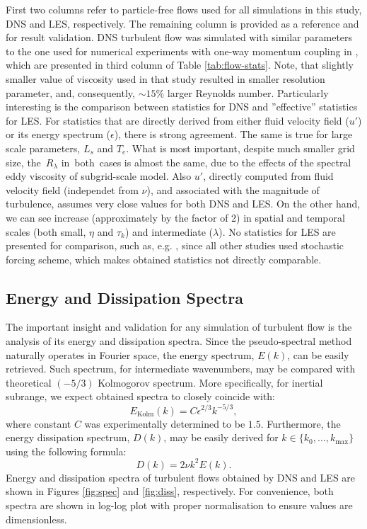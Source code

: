 \documentclass{pracamgren}
\begin{document}
First two columns refer to particle-free flows used for all simulations in this study, DNS and LES, respectively.
The remaining column is provided as a reference and for result validation.
DNS turbulent flow was simulated with similar parameters to the one used for numerical experiments with one-way momentum coupling in \textcite[Table 1, entry for $256^3$]{Rosa2013}, which are presented in third column of Table \ref{tab:flow-stats}.
Note, that slightly smaller value of viscosity used in that study resulted in smaller resolution parameter, and, consequently, $\sim 15\%$ larger Reynolds number.
Particularly interesting is the comparison between statistics for DNS and ''effective'' statistics for LES.
For statistics that are directly derived from either fluid velocity field ($u'$) or its energy spectrum ($\epsilon$), there is strong agreement.
The same is true for large scale parameters, $L_s$ and $T_e$.
What is most important, despite much smaller grid size, the~$R_{\lambda}$ in~both~cases is almost the same, due to the effects of the spectral eddy viscosity of subgrid-scale model.
Also $u'$, directly computed from fluid velocity field (independet from $\nu$), and associated with the magnitude of turbulence, assumes very close values for both DNS and LES.  
On the other hand, we can see increase (approximately by the factor of 2) in spatial and temporal scales (both small, $\eta$ and $\tau_k$) and intermediate ($\lambda$).
No statistics for LES are presented for comparison, such as, e.g. \textcite[Table 1]{Rosa2017}, since all other studies used stochastic forcing scheme, which makes obtained statistics not directly comparable.

\subsection{Energy and Dissipation Spectra}
\label{ssc:ch2.flow.spec}

The important insight and validation for any simulation of turbulent flow is the analysis of its energy and dissipation spectra.
Since the pseudo-spectral method naturally operates in Fourier space, the energy spectrum, $E(k)$, can be easily retrieved.
Such spectrum, for intermediate wavenumbers, may be compared with theoretical $(-5/3)$ Kolmogorov spectrum.
More specifically, for inertial subrange, we expect obtained spectra to closely coincide with:
\begin{equation}
E_{\text{Kolm}}(k) = C \epsilon^{2/3} k^{-5/3} ,
\label{eqn:kolm}
\end{equation}
where constant $C$ was experimentally determined to be $1.5$. 
Furthermore, the energy dissipation spectrum, $D(k)$, may be easily derived for $k \in \{ k_{0}, \ldots, k_{\max} \}$ using the following formula:
$$ D(k) = 2 \nu k^{2} E(k) . $$
Energy and dissipation spectra of turbulent flows obtained by DNS and LES are shown in Figures \ref{fig:spec} and \ref{fig:diss}, respectively.
For convenience, both spectra are shown in log-log plot with proper normalisation to ensure values are dimensionless.
\end{document}
